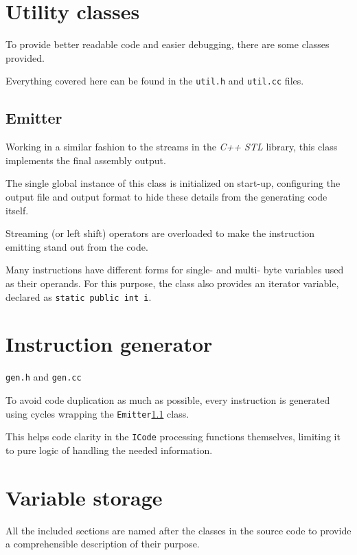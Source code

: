     \section{Utility classes}

    To provide better readable code and easier debugging, there are some classes provided.

    Everything covered here can be found in the \texttt{util.h} and \texttt{util.cc} files.

        \subsection{Emitter}\label{emitter}

        Working in a similar fashion to the streams in the \emph{C++ STL} library, this class implements the final assembly output.

        The single global instance of this class is initialized on start-up, configuring the output file and output format to hide these details from the generating code itself.

        Streaming (or left shift) operators are overloaded to make the instruction emitting stand out from the code.

        Many instructions have different forms for single- and multi- byte variables used as their operands. For this purpose, the class also provides an iterator variable, declared as \texttt{static public int i}.

    \section{Instruction generator}

    \texttt{gen.h} and \texttt{gen.cc}

    To avoid code duplication as much as possible, every instruction is generated using cycles wrapping the \texttt{Emitter}\ref{emitter} class.

    This helps code clarity in the \texttt{ICode} processing functions themselves, limiting it to pure logic of handling the needed information.

    \section{Variable storage}

    All the included sections are named after the classes in the source code to provide a comprehensible description of their purpose.

